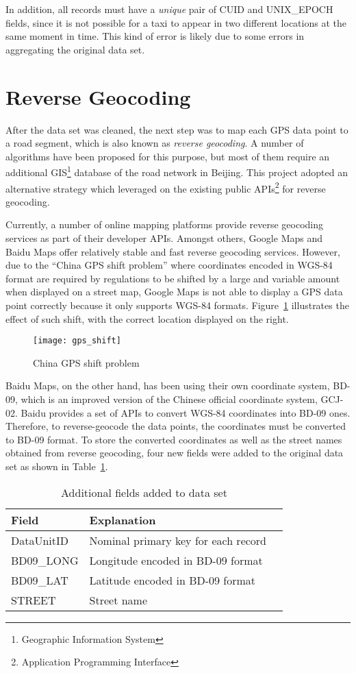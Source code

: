 In addition, all records must have a \emph{unique} pair of CUID and UNIX\_EPOCH fields, since it is not possible for a taxi to appear in two different locations at the same moment in time. This kind of error is likely due to some errors in aggregating the original data set.

\section{Reverse Geocoding}
After the data set was cleaned, the next step was to map each GPS data point to a road segment, which is also known as \emph{reverse geocoding}. A number of algorithms\cite{MAP09} have been proposed for this purpose, but most of them require an additional GIS\footnote{Geographic Information System} database of the road network in Beijing. This project adopted an alternative strategy which leveraged on the existing public APIs\footnote{Application Programming Interface} for reverse geocoding. 

Currently, a number of online mapping platforms provide reverse geocoding services as part of their developer APIs. Amongst others, Google Maps and Baidu Maps offer relatively stable and fast reverse geocoding services. However, due to the ``China GPS shift problem''\cite{GSHF17} where coordinates encoded in WGS-84 format are required by regulations to be shifted by a large and variable amount when displayed on a street map, Google Maps is not able to display a GPS data point correctly because it only supports WGS-84 formats. Figure~\ref{Fig:gps_shift} illustrates the effect of such shift, with the correct location displayed on the right. 

\begin{figure}[h]
\texttt{[image: gps\_shift]}
\centering
\caption{China GPS shift problem}\label{Fig:gps_shift}
\end{figure}

Baidu Maps, on the other hand, has been using their own coordinate system, BD-09, which is an improved version of the Chinese official coordinate system, GCJ-02. Baidu provides a set of APIs to convert WGS-84 coordinates into BD-09 ones. Therefore, to reverse-geocode the data points, the coordinates must be converted to BD-09 format. To store the converted coordinates as well as the street names obtained from reverse geocoding, four new fields were added to the original data set as shown in Table~\ref{Ta:addtional_field}.

\begin{table}
\centering
\begin{tabular}{ | l | l | l | }
\hline
\textbf{Field} & \textbf{Explanation} \\ \hline
DataUnitID & Nominal primary key for each record \\ \hline
BD09\_LONG & Longitude encoded in BD-09 format\\ \hline
BD09\_LAT & Latitude encoded in BD-09 format\\ \hline
STREET & Street name\\ \hline
\end{tabular}
\caption{Additional fields added to data set}\label{Ta:addtional_field}
\end{table}

